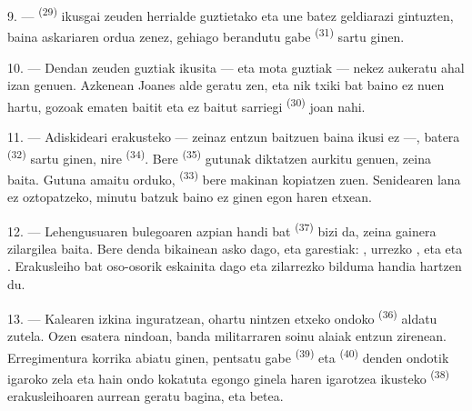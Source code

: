9. ---  \textsuperscript{(29)}
 ikusgai zeuden herrialde guztietako  eta
 une batez geldiarazi gintuzten, baina askariaren ordua zenez,
gehiago berandutu gabe  \textsuperscript{(31)} sartu ginen.

10. --- Dendan zeuden  guztiak ikusita ---  eta  mota guztiak --- nekez aukeratu ahal izan
genuen. Azkenean Joanes  alde geratu zen, eta nik
 txiki bat baino ez nuen hartu, gozoak  ematen baitit eta ez baitut sarriegi 
\textsuperscript{(30)} joan nahi.

\VUsaut{3.0mm}

11. --- Adiskideari  erakusteko --- zeinaz entzun baitzuen
baina ikusi ez ---,  batera \textsuperscript{(32)} sartu ginen, nire
 \textsuperscript{(34)}. Bere 
\textsuperscript{(35)} gutunak diktatzen aurkitu genuen, zeina
 baita. Gutuna amaitu orduko, 
\textsuperscript{(33)} bere makinan kopiatzen zuen. Senidearen lana ez oztopatzeko,
minutu batzuk baino ez ginen egon haren etxean.

12. --- Lehengusuaren bulegoaren azpian  handi
bat \textsuperscript{(37)} bizi da, zeina gainera zilargilea baita. Bere denda
bikainean  asko dago,
 eta  garestiak: , urrezko
,  eta 
 eta . Erakusleiho bat oso-osorik
 eskainita dago eta zilarrezko  bilduma
handia hartzen du.

13. --- Kalearen izkina inguratzean, ohartu nintzen etxeko 
ondoko  \textsuperscript{(36)} aldatu zutela. Ozen esatera nindoan,
banda militarraren soinu alaiak entzun zirenean. Erregimentura korrika abiatu
ginen, pentsatu gabe  \textsuperscript{(39)} eta
 \textsuperscript{(40)} denden ondotik igaroko zela eta
hain ondo kokatuta egongo ginela haren igarotzea ikusteko 
\textsuperscript{(38)} erakusleihoaren aurrean geratu bagina,  eta  betea.

